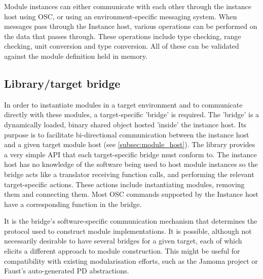 Module instances can either communicate with each other through the instance host using OSC, or using an environment-specific messaging system. When messages pass through the Instance host, various operations can be performed on the data that passes through. These operations include type checking, range checking, unit conversion and type conversion. All of these can be validated against the module definition held in memory.
 
\subsection{Library/target bridge}\label{subsec:bridge}

In order to instantiate modules in a target environment and to communicate directly with these modules, a target-specific 'bridge' is required. The 'bridge' is a dynamically loaded, binary shared object hosted 'inside' the instance host. Its purpose is to facilitate bi-directional communication between the instance host and a given target module host (see \ref{subsec:module_host}). The library provides a very simple API that each target-specific bridge must conform to. The instance host has no knowledge of the software being used to host module instances so the bridge acts like a translator receiving function calls, and performing the relevant target-specific actions. These actions include instantiating modules, removing them and connecting them. Most OSC commands supported by the Instance host have a corresponding function in the bridge.

It is the bridge's software-specific communication mechanism that determines the protocol used to construct module implementations. It is possible, although not necessarily desirable to have several bridges for a given target, each of which elicits a different approach to module construction. This might be useful for compatibility with existing modularisation efforts, such as the Jamoma project or Faust's auto-generated PD abstractions.

